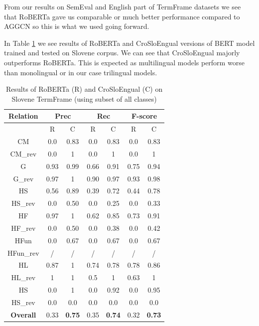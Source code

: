 \documentclass[fleqn,moreauthors,10pt]{ds_report}
\begin{document}
\par From our results on SemEval and English part of TermFrame datasets we see that RoBERTa gave us comparable or much better performance compared to AGGCN so this is what we used going forward. 
\par In Table \ref{tab:karst_subset2_en_sl} we see results of RoBERTa and CroSloEngual versions of BERT model trained and tested on Slovene corpus. We can see that CroSloEngual majorly outperforms RoBERTa. This is expected as multilingual models perform worse than monolingual or in our case trilingual models. 

\begin{table}[!ht]
    \centering
    \begin{tabular}{|c|c | c|c | c|c | c|}
        \hline
        \textbf{Relation} & \multicolumn{2}{|c|}{\textbf{Prec}} & \multicolumn{2}{|c|}{\textbf{Rec}} & \multicolumn{2}{|c|}{\textbf{F-score}} \\ \hline \hline
        &  R & C &  R  & C &  R & C\\ \hline
        CM \footnotemark[1]  & 0.0 & 0.83 & 0.0 & 0.83 & 0.0 & 0.83 \\ \hline
        CM\_rev \footnotemark[2]  & 0.0  & 1 & 0.0 & 1 & 0.0 & 1 \\ \hline
        G               & 0.93  & 0.99 & 0.66  & 0.91 & 0.75 &  0.94\\ \hline
        G\_rev               & 0.97 & 1 & 0.90  & 0.97 & 0.93 &  0.98\\ \hline
        HS           &  0.56 & 0.89 &  0.39 &  0.72 &  0.44 & 0.78\\ \hline
        HS\_rev           &  0.0 & 0.50 &  0.0 &  0.25 &  0.0 & 0.33\\ \hline
        HF           &  0.97 & 1 &  0.62 & 0.85 &  0.73 & 0.91 \\ \hline
        HF\_rev           &  0.0 & 0.50 &  0.0 & 0.38 &  0.0 & 0.42 \\ \hline
        HFun       & 0.0  & 0.67 &  0.0 & 0.67 &  0.0 & 0.67 \\ \hline
        HFun\_rev        & /  & / &  / & / &  / & / \\ \hline
        HL        &  0.87  & 1 & 0.74 & 0.78 &  0.78 & 0.86 \\ \hline
        HL\_rev        &  1  & 1 & 0.5 & 1 &  0.63 & 1 \\ \hline
        HS            & 0.0 & 1 & 0.0  & 0.92 & 0.0 & 0.95\\ \hline
        HS\_rev            & 0.0 & 0.0 & 0.0  & 0.0 & 0.0 & 0.0\\ \hline \hline
        \textbf{Overall} & 0.33 & \textbf{0.75} & 0.35 & \textbf{0.74} & 0.32 & \textbf{0.73}\\ \hline
    \end{tabular}
    \caption{Results of RoBERTa (R) and CroSloEngual (C) on Slovene TermFrame (using subset of all classes)}
    \label{tab:karst_subset2_en_sl}
\end{table}
\end{document}
